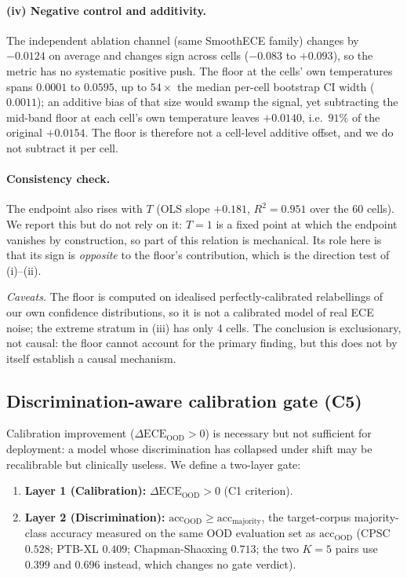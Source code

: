 \documentclass[review,12pt,nonatbib]{elsarticle}
\begin{document}
\paragraph{(iv) Negative control and additivity.} The independent
ablation channel (same SmoothECE family) changes by $-0.0124$ on average
and changes sign across cells ($-0.083$ to $+0.093$), so the metric has
no systematic positive push. The floor at the cells' own temperatures
spans $0.0001$ to $0.0595$, up to $54\times$ the median per-cell
bootstrap CI width ($0.0011$); an additive bias of that size would swamp
the signal, yet subtracting the mid-band floor at each cell's own
temperature leaves $+0.0140$, i.e.\ $91\%$ of the original $+0.0154$. The
floor is therefore not a cell-level additive offset, and we do not
subtract it per cell.

\paragraph{Consistency check.} The endpoint also rises with $T$ (OLS
slope $+0.181$, $R^2 = 0.951$ over the 60 cells). We report this but do
not rely on it: $T = 1$ is a fixed point at which the endpoint vanishes
by construction, so part of this relation is mechanical. Its role here
is that its sign is \emph{opposite} to the floor's contribution, which is
the direction test of (i)--(ii).

\emph{Caveats.} The floor is computed on idealised perfectly-calibrated
relabellings of our own confidence distributions, so it is not a
calibrated model of real ECE noise; the extreme stratum in (iii) has only
4 cells. The conclusion is exclusionary, not causal: the floor cannot
account for the primary finding, but this does not by itself establish a
causal mechanism.

\subsection{Discrimination-aware calibration gate (C5)}
\label{sec:gate}
Calibration improvement ($\Delta\text{ECE}_{\text{OOD}} > 0$) is
necessary but not sufficient for deployment: a model whose
discrimination has collapsed under shift may be recalibrable but
clinically useless. We define a two-layer gate:
\begin{enumerate}
    \item \textbf{Layer 1 (Calibration):} $\Delta\text{ECE}_{\text{OOD}} > 0$
    (C1 criterion).
    \item \textbf{Layer 2 (Discrimination):} $\text{acc}_{\text{OOD}} \geq
    \text{acc}_{\text{majority}}$, the target-corpus majority-class
    accuracy measured on the same OOD evaluation set as
    $\text{acc}_{\text{OOD}}$ (CPSC $0.528$; PTB-XL $0.409$;
    Chapman-Shaoxing $0.713$; the two $K{=}5$ pairs use $0.399$ and
    $0.696$ instead, which changes no gate verdict).
\end{enumerate}
\end{document}
